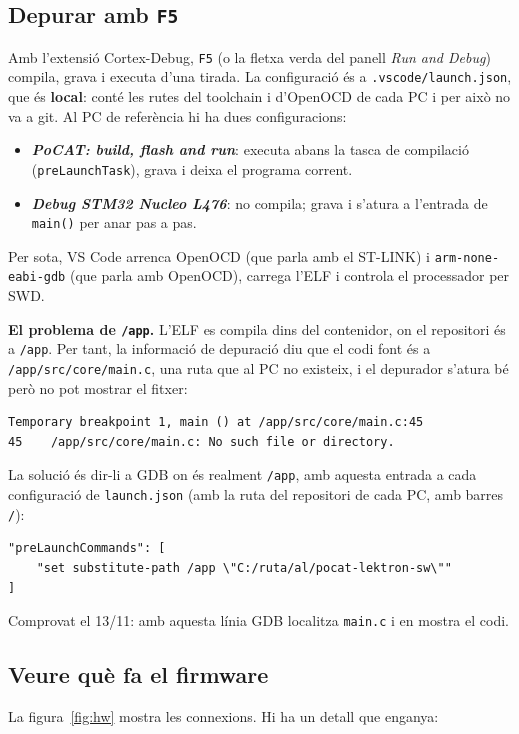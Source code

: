 \documentclass[11pt,a4paper]{article}
\DeclareRobustCommand{\_}{\textunderscore\allowbreak}
\newcommand{\cd}[1]{\texttt{#1}}
\begin{document}
\subsection{Depurar amb \texorpdfstring{\cd{F5}}{F5}}

Amb l'extensió Cortex-Debug, \cd{F5} (o la fletxa verda del panell \emph{Run and Debug})
compila, grava i executa d'una tirada. La configuració és a \cd{.vscode/launch.json}, que
és \textbf{local}: conté les rutes del toolchain i d'OpenOCD de cada PC i per això no va a
git. Al PC de referència hi ha dues configuracions:
\begin{itemize}
\item \textbf{\emph{PoCAT: build, flash and run}}: executa abans la tasca de compilació
  (\cd{preLaunchTask}), grava i deixa el programa corrent.
\item \textbf{\emph{Debug STM32 Nucleo L476}}: no compila; grava i s'atura a l'entrada de
  \cd{main()} per anar pas a pas.
\end{itemize}

Per sota, VS Code arrenca OpenOCD (que parla amb el ST-LINK) i \cd{arm-none-eabi-gdb} (que
parla amb OpenOCD), carrega l'ELF i controla el processador per SWD.

\textbf{El problema de \cd{/app}.} L'ELF es compila dins del contenidor, on el repositori és
a \cd{/app}. Per tant, la informació de depuració diu que el codi font és a
\cd{/app/src/core/main.c}, una ruta que al PC no existeix, i el depurador s'atura bé però
no pot mostrar el fitxer:
\begin{lstlisting}[style=out]
Temporary breakpoint 1, main () at /app/src/core/main.c:45
45    /app/src/core/main.c: No such file or directory.
\end{lstlisting}
La solució és dir-li a GDB on és realment \cd{/app}, amb aquesta entrada a cada
configuració de \cd{launch.json} (amb la ruta del repositori de cada PC, amb barres \cd{/}):
\begin{lstlisting}
"preLaunchCommands": [
    "set substitute-path /app \"C:/ruta/al/pocat-lektron-sw\""
]
\end{lstlisting}
Comprovat el 13/11: amb aquesta línia GDB localitza \cd{main.c} i en mostra el codi.

\subsection{Veure què fa el firmware}

La figura~\ref{fig:hw} mostra les connexions. Hi ha un detall que enganya:
\end{document}

